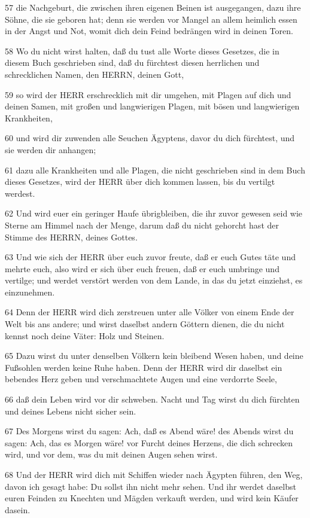 \par 57 die Nachgeburt, die zwischen ihren eigenen Beinen ist ausgegangen, dazu ihre Söhne, die sie geboren hat; denn sie werden vor Mangel an allem heimlich essen in der Angst und Not, womit dich dein Feind bedrängen wird in deinen Toren.
\par 58 Wo du nicht wirst halten, daß du tust alle Worte dieses Gesetzes, die in diesem Buch geschrieben sind, daß du fürchtest diesen herrlichen und schrecklichen Namen, den HERRN, deinen Gott,
\par 59 so wird der HERR erschrecklich mit dir umgehen, mit Plagen auf dich und deinen Samen, mit großen und langwierigen Plagen, mit bösen und langwierigen Krankheiten,
\par 60 und wird dir zuwenden alle Seuchen Ägyptens, davor du dich fürchtest, und sie werden dir anhangen;
\par 61 dazu alle Krankheiten und alle Plagen, die nicht geschrieben sind in dem Buch dieses Gesetzes, wird der HERR über dich kommen lassen, bis du vertilgt werdest.
\par 62 Und wird euer ein geringer Haufe übrigbleiben, die ihr zuvor gewesen seid wie Sterne am Himmel nach der Menge, darum daß du nicht gehorcht hast der Stimme des HERRN, deines Gottes.
\par 63 Und wie sich der HERR über euch zuvor freute, daß er euch Gutes täte und mehrte euch, also wird er sich über euch freuen, daß er euch umbringe und vertilge; und werdet verstört werden von dem Lande, in das du jetzt einziehst, es einzunehmen.
\par 64 Denn der HERR wird dich zerstreuen unter alle Völker von einem Ende der Welt bis ans andere; und wirst daselbst andern Göttern dienen, die du nicht kennst noch deine Väter: Holz und Steinen.
\par 65 Dazu wirst du unter denselben Völkern kein bleibend Wesen haben, und deine Fußsohlen werden keine Ruhe haben. Denn der HERR wird dir daselbst ein bebendes Herz geben und verschmachtete Augen und eine verdorrte Seele,
\par 66 daß dein Leben wird vor dir schweben. Nacht und Tag wirst du dich fürchten und deines Lebens nicht sicher sein.
\par 67 Des Morgens wirst du sagen: Ach, daß es Abend wäre! des Abends wirst du sagen: Ach, das es Morgen wäre! vor Furcht deines Herzens, die dich schrecken wird, und vor dem, was du mit deinen Augen sehen wirst.
\par 68 Und der HERR wird dich mit Schiffen wieder nach Ägypten führen, den Weg, davon ich gesagt habe: Du sollst ihn nicht mehr sehen. Und ihr werdet daselbst euren Feinden zu Knechten und Mägden verkauft werden, und wird kein Käufer dasein.

